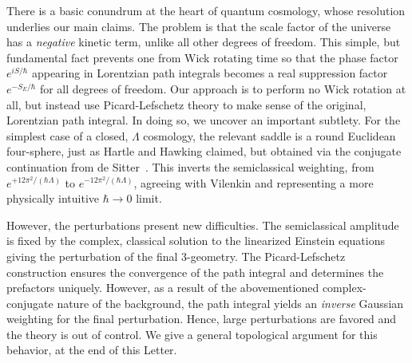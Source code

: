 \documentclass[twocolumn,amsmath,amssymb,superscriptaddress,nofootinbib]{revtex4-1}
\begin{document}
There is a basic conundrum at the heart of quantum cosmology, whose resolution underlies our main claims. The problem is that the scale factor of the universe has a {\it negative} kinetic term, unlike all other degrees of freedom. This simple, but fundamental fact prevents one from Wick rotating time so that the phase factor $e^{i S/\hbar}$ appearing in Lorentzian path integrals becomes a real suppression factor $e^{-S_E/\hbar}$ for all degrees of freedom. Our approach is to perform no Wick rotation at all, but instead use Picard-Lefschetz theory to make sense of the original, Lorentzian path integral. In doing so, we uncover an important subtlety. For the simplest case of a closed, $\Lambda$ cosmology, the relevant saddle is a round Euclidean four-sphere, just as Hartle and Hawking claimed, but obtained via the conjugate continuation from de Sitter~\cite{Feldbrugge:2017kzv}. This inverts the semiclassical weighting, from $e^{+12\pi^2/(\hbar \Lambda)}$ to  $e^{-12\pi^2/(\hbar \Lambda)}$, agreeing with Vilenkin and representing a more physically intuitive $\hbar\rightarrow 0$ limit. 

However, the perturbations present new difficulties. The semiclassical amplitude is fixed by the complex, classical solution to the linearized Einstein equations giving the perturbation of the final 3-geometry. The Picard-Lefschetz construction ensures the convergence of the path integral and determines the prefactors uniquely. However, as a result of the abovementioned complex-conjugate nature of the background, the path integral yields an {\it inverse} Gaussian weighting for the final perturbation. Hence, large perturbations are favored and the theory is out of control. We give a general topological argument for this behavior, at the end of this Letter. 
\end{document}
